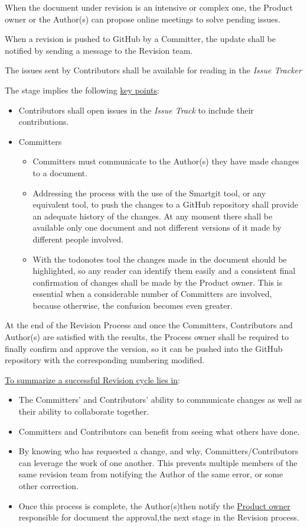 \documentclass{template/openetcs_article}
\begin{document}
When the document under revision is an intensive or complex one, the Product owner or the Author(s) can propose online meetings to solve pending issues.  

When a revision is pushed to GitHub by a Committer, the update shall be notified by sending a message to the Revision team.

The issues sent by Contributors shall be available for reading in the {\it Issue Tracker}

The stage implies the following \underline{key points}:

\begin{itemize}
\item Contributors shall open issues in the {\it Issue Track} to include their contributions.
\item Committers 
\begin{itemize}
\item Committers must communicate to the Author(s) they have made changes to a document. 
\item Addressing the process with the use of the Smartgit tool, or any equivalent tool, to push the changes to a GitHub repository shall provide an
adequate history of the changes. At any moment there shall be available only one document and not different versions of it made by different people involved. 
\item With the todonotes tool the changes made in the document should be highlighted, so any reader can identify them easily and a consistent final confirmation of changes shall be made by the Product owner. This is essential when a considerable number of Committers are involved, because otherwise, the confusion becomes even greater.
\end{itemize}
\end{itemize}

At the end of the Revision Process and once the Committers, Contributors and Author(s) are satisfied with the results, the Process owner shall be required to finally confirm and approve the version, so it can be pushed into the GitHub repository with the corresponding numbering modified.

\underline{To summarize a successful Revision cycle lies in}:
\begin{itemize}
\item The Committers’ and Contributors' ability to communicate changes as well as their ability to collaborate together. 
\item Committers and Contributors can benefit from seeing what others have done.
\item By knowing who has requested a change, and why, Committers/Contributors can leverage the work of one another. This prevents multiple members of the same revision team from notifying the Author of the same error, or some other correction.
\item Once this process is complete, the Author(s)then notify the \underline{Product owner} responsible for document the approval,the next stage in the Revision process.
\end{itemize}
\end{document}
